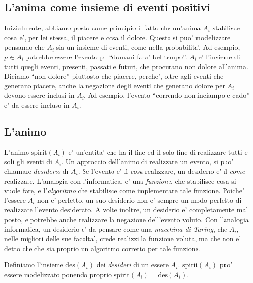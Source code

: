 \subsection{L'anima come insieme di eventi positivi}
\label{AnimaInsiemeEventi}
Inizialmente, abbiamo posto come principio il fatto che un'anima $A_i$ stabilisce cosa e', per lei stessa, il piacere e cosa il dolore. Questo si puo' modelizzare pensando che $A_i$ sia un insieme di eventi, come nella probabilita'. Ad esempio, $p\in A_i$ potrebbe essere l'evento p=``domani fara' bel tempo''. $A_i$ e' l'insieme di tutti quegli eventi, presenti, passati e futuri, che procurano non dolore all'anima. Diciamo ``non dolore'' piuttosto che piacere, perche', oltre agli eventi che generano piacere, anche la negazione degli eventi che generano dolore per $A_i$ devono essere inclusi in $A_i$. Ad esempio, l'evento ``correndo non inciampo e cado'' e' da essere incluso in $A_i$.


\subsection{L'animo}

\def\des{\textrm{des}}
\label{defDiDesideriDes}

\def\anima#1{\mathcal{#1}}

\def\spirit#1{\textrm{spirit}(#1)}
\def\Animo#1{\spirit{\anima{#1}}}

L'animo $\spirit{A_i}$ e' un'entita' che ha il fine ed il solo fine di realizzare tutti e soli gli eventi di $A_i$. Un approccio dell'animo di realizzare un evento, si puo' chiamare \emph{desiderio} di $A_i$. Se l'evento e' il \emph{cosa} realizzare, un desiderio e' il \emph{come} realizzare. L'analogia con l'informatica, e' una \emph{funzione}, che stabilisce cosa si vuole fare, e l'\emph{algoritmo} che stabilisce come implementare tale funzione. Poiche' l'essere $A_i$ non e' perfetto, un suo desiderio non e' sempre un modo perfetto di realizzare l'evento desiderato. A volte inoltre, un desiderio e' completamente mal posto, e potrebbe anche realizzare la negazione dell'evento voluto. Con l'analogia informatica, un desiderio e' da pensare come una \emph{macchina di Turing}, che $A_i$, nelle migliori delle sue facolta', crede realizzi la funzione voluta, ma che non e' detto che che sia proprio un algoritmo corretto per tale funzione.

Definiamo l'insieme $\des(A_i)$ dei \emph{desideri} di un essere $A_i$. $\spirit{A_i}$ puo' essere modelizzato ponendo proprio $\spirit{A_i}=\des(A_i)$. 

